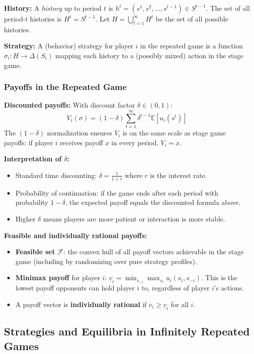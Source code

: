 \documentclass[hidelinks]{article}
\begin{document}
\textbf{History:} A \textit{history} up to period $t$ is $h^t = (s^1, s^2, \ldots, s^{t-1}) \in S^{t-1}$. The set of all period-$t$ histories is $H^t = S^{t-1}$. Let $H = \bigcup_{t=1}^\infty H^t$ be the set of all possible histories.

\textbf{Strategy:} A (behavior) strategy for player $i$ in the repeated game is a function $\sigma_i : H \to \Delta(S_i)$ mapping each history to a (possibly mixed) action in the stage game.

\subsubsection{Payoffs in the Repeated Game}

\textbf{Discounted payoffs:} With discount factor $\delta \in (0,1)$:
\[
V_i(\sigma) = (1-\delta) \sum_{t=1}^\infty \delta^{t-1} \mathbb{E}\left[u_i(s^t)\right]
\]
The $(1-\delta)$ normalization ensures $V_i$ is on the same scale as stage game payoffs: if player $i$ receives payoff $x$ in every period, $V_i = x$.

\textbf{Interpretation of $\delta$:}
\begin{itemize}
    \item Standard time discounting: $\delta = \frac{1}{1+r}$ where $r$ is the interest rate.
    \item Probability of continuation: if the game ends after each period with probability $1-\delta$, the expected payoff equals the discounted formula above.
    \item Higher $\delta$ means players are more patient or interaction is more stable.
\end{itemize}

\textbf{Feasible and individually rational payoffs:}
\begin{itemize}
    \item \textbf{Feasible set} $\mathcal{F}$: the convex hull of all payoff vectors achievable in the stage game (including by randomizing over pure strategy profiles).
    \item \textbf{Minimax payoff} for player $i$: $\underline{v}_i = \min_{s_{-i}} \max_{s_i} u_i(s_i, s_{-i})$. This is the lowest payoff opponents can hold player $i$ to, regardless of player $i$'s actions.
    \item A payoff vector is \textbf{individually rational} if $v_i \geq \underline{v}_i$ for all $i$.
\end{itemize}

\subsection{Strategies and Equilibria in Infinitely Repeated Games}
\end{document}
